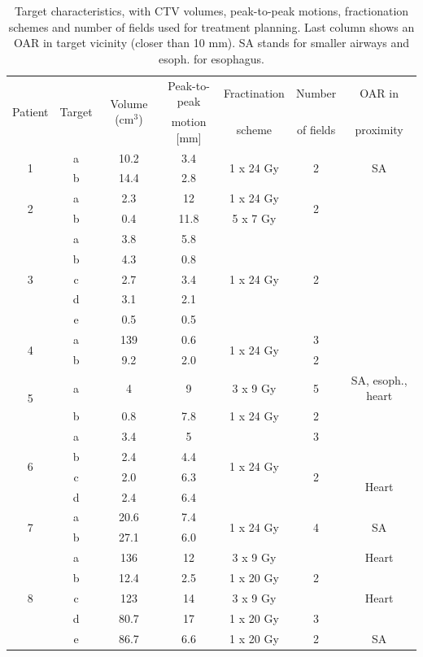\documentclass[type=dr, dr=rernat, accentcolor=tud7b,colorbacktitle, bigchapter, openright, twoside, 12pt ]{tudthesis}
\begin{document}
\begin{table}[H]
	\centering
	\caption{Target characteristics, with CTV volumes, peak-to-peak motions, fractionation schemes and number of fields used for treatment planning. Last column 
	shows an OAR in target vicinity (closer than 10 mm). SA stands for smaller airways and esoph. for esophagus.}
	\begin{tabular}{c|c|c|c|c|c|c}
		\hline\hline
		\multirow{2}{*}{Patient} & \multirow{2}{*}{Target} & \multirow{2}{*}{Volume (cm$^3$)} & Peak-to-peak & Fractination & Number & OAR in \\
		 & & & motion [mm] & scheme & of fields & proximity \\
		\hline
		\multirow{2}{*}{1} & a & 10.2 & 3.4  & \multirow{2}{*}{1 x 24 Gy} & \multirow{2}{*}{2} & \multirow{2}{*}{SA} \\
		 & b & 14.4 & 2.8 &  &  &  \\

		 \hline
		 \multirow{2}{*}{2} & a & 2.3 & 12  & 1 x 24 Gy & \multirow{2}{*}{2} \\
		 & b & 0.4 & 11.8  & 5 x 7 Gy &  \\
		 \hline
		 \multirow{5}{*}{3} & a & 3.8 & 5.8  & \multirow{5}{*}{1 x 24 Gy} & \multirow{5}{*}{2} \\
		  & b & 4.3 & 0.8  &  & \\
		  & c & 2.7 & 3.4  &  & \\
		  & d & 3.1 & 2.1  &  & \\
		  & e & 0.5 & 0.5  &  & \\
		  \hline
		  \multirow{2}{*}{4} & a & 139 & 0.6 & \multirow{2}{*}{1 x 24 Gy} & 3 \\
		 & b & 9.2 & 2.0  &  & 2 \\
		 \hline
		 \multirow{2}{*}{5} & a & 4 & 9  & 3 x 9 Gy  & 5 & SA, esoph., heart \\
		 & b & 0.8 & 7.8  & 1 x 24 Gy & 2 \\
		 \hline
		 \multirow{4}{*}{6} & a & 3.4   & 5    & \multirow{4}{*}{1 x 24 Gy} & 3  \\
				    & b & 2.4 & 4.4  & & \multirow{3}{*}{2} \\
				    & c & 2.0 & 6.3  & & & \multirow{2}{*}{Heart}\\
				    & d & 2.4 & 6.4  & & \\
		\hline	    
		\multirow{2}{*}{7} & a & 20.6 & 7.4 & \multirow{2}{*}{1 x 24 Gy} & \multirow{2}{*}{4} & \multirow{2}{*}{SA}  \\
		 & b & 27.1 & 6.0  &  &   \\
		 \hline
		 \multirow{5}{*}{8} & a & 136 & 12  & 3 x 9 Gy & \multirow{3}{*}{2} & Heart\\
		  & b & 12.4 & 2.5  & 1 x 20 Gy &  &\\
		  & c & 123 & 14  & 3 x 9 Gy &  &Heart \\
		 & d & 80.7 & 17  & 1 x 20 Gy & 3  &\\
		 & e & 86.7 & 6.6  & 1 x 20 Gy & 2 & SA \\
		 
		
		\hline\hline
% 		 
% 		
	\end{tabular}
	\label{tab:patdata2}
\end{table}
\end{document}

